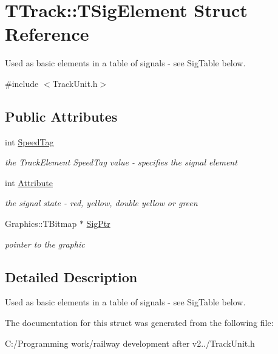 \hypertarget{struct_t_track_1_1_t_sig_element}{}\section{T\+Track\+:\+:T\+Sig\+Element Struct Reference}
\label{struct_t_track_1_1_t_sig_element}


Used as basic elements in a table of signals -\/ see Sig\+Table below.  




{\ttfamily \#include $<$Track\+Unit.\+h$>$}

\subsection*{Public Attributes}
\begin{DoxyCompactItemize}
\item 
\mbox{\label{struct_t_track_1_1_t_sig_element_a34471e55de8fcc915046b28706156071}} 
int \mbox{\hyperlink{struct_t_track_1_1_t_sig_element_a34471e55de8fcc915046b28706156071}{Speed\+Tag}}
\begin{DoxyCompactList}\small\item\em the Track\+Element Speed\+Tag value -\/ specifies the signal element \end{DoxyCompactList}\item 
\mbox{\label{struct_t_track_1_1_t_sig_element_aaf0195d7519c41c5f2acc57c07b6fb83}} 
int \mbox{\hyperlink{struct_t_track_1_1_t_sig_element_aaf0195d7519c41c5f2acc57c07b6fb83}{Attribute}}
\begin{DoxyCompactList}\small\item\em the signal state -\/ red, yellow, double yellow or green \end{DoxyCompactList}\item 
\mbox{\label{struct_t_track_1_1_t_sig_element_a8e0002e65092d0c2f40adc3980de42c3}} 
Graphics\+::\+T\+Bitmap $\ast$ \mbox{\hyperlink{struct_t_track_1_1_t_sig_element_a8e0002e65092d0c2f40adc3980de42c3}{Sig\+Ptr}}
\begin{DoxyCompactList}\small\item\em pointer to the graphic \end{DoxyCompactList}\end{DoxyCompactItemize}


\subsection{Detailed Description}
Used as basic elements in a table of signals -\/ see Sig\+Table below. 

The documentation for this struct was generated from the following file\+:\begin{DoxyCompactItemize}
\item 
C\+:/\+Programming work/railway development after v2../Track\+Unit.\+h\end{DoxyCompactItemize}

